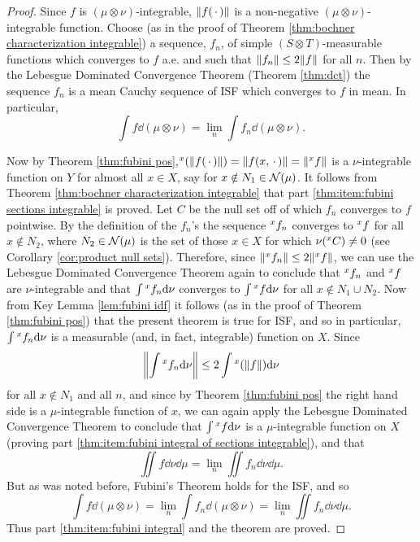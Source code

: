 \begin{proof}
Since $f$ is $(\mu\otimes\nu)$-integrable, $\norm{f(\imarg)}$ is a non-negative $(\mu\otimes\nu)$-integrable function. Choose (as in the proof of Theorem \ref{thm:bochner characterization integrable}) a sequence, $f_n$, of simple $(S\otimes T)$-measurable functions which converges to $f$ a.e. and such that $\norm{f_n}\leq 2\norm{f}$ for all $n$. Then by the Lebesgue Dominated Convergence Theorem (Theorem \ref{thm:dct}) the sequence $f_n$ is a mean Cauchy sequence of ISF which converges to $f$ in mean. In particular, \[\int f\dd(\mu\otimes\nu)=\lim_n\int f_n\dd(\mu\otimes\nu).\]

Now by Theorem \ref{thm:fubini pos},$\xsec{(\norm{f(\imarg)})}{x}=\norm{f(x,\imarg)}=\norm{\xsec{f}{x}}$ is a $\nu$-integrable function on $Y$ for almost all $x\in X$, say for $x\notin N_1\in\nring{\mu}$. It follows from Theorem \ref{thm:bochner characterization integrable} that part \ref{thm:item:fubini sections integrable} is proved. Let $C$ be the null set off of which $f_n$ converges to $f$ pointwise. By the definition of the $f_n$'s the sequence $\xsec{f_n}{x}$ converges to $\xsec{f}{x}$ for all $x\notin N_2$, where $N_2\in\nring{\mu}$ is the set of those $x\in X$ for which $\nu(\xsec{C}{x})\neq 0$ (see Corollary \ref{cor:product null sets}). Therefore, since $\norm{\xsec{f_n}{x}}\leq2\norm{\xsec{f}{x}}$, we can use the Lebesgue Dominated Convergence Theorem again to conclude that $\xsec{f_n}{x}$ and $\xsec{f}{x}$ are $\nu$-integrable and that $\int\xsec{f_n}{x}\dd\nu$ converges to $\int\xsec{f}{x}\dd\nu$ for all $x\notin N_1\cup N_2$. Now from Key Lemma \ref{lem:fubini idf} it follows (as in the proof of Theorem \ref{thm:fubini pos}) that the present theorem is true for ISF, and so in particular, $\int\xsec{f_n}{x}\dd\nu$ is a measurable (and, in fact, integrable) function on $X$. Since \[\norm{\int\xsec{f_n}{x}\dd\nu}\leq2\int\xsec{(\norm{f})}{x}\dd\nu\] for all $x\notin N_1$ and all $n$, and since by Theorem \ref{thm:fubini pos} the right hand side is a $\mu$-integrable function of $x$, we can again apply the Lebesgue Dominated Convergence Theorem to conclude that $\int\xsec{f}{x}\dd\nu$ is a $\mu$-integrable function on $X$ (proving part \ref{thm:item:fubini integral of sections integrable}), and that \[\iint f\dd\nu\dd\mu=\lim_n\iint f_n\dd\nu\dd\mu.\] But as was noted before, Fubini's Theorem holds for the ISF, and so \[\int f\dd(\mu\otimes\nu)=\lim_n\int f_n\dd(\mu\otimes\nu)=\lim_n\iint f_n\dd\nu\dd\mu.\] Thus part \ref{thm:item:fubini integral} and the theorem are proved.
\end{proof}

